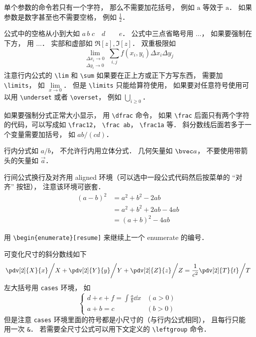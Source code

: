 单个参数的命令若只有一个字符， 那么不需要加花括号， 例如 $\mathrm a$ 等效于 $\mathrm{a}$． 如果参数是数字甚至也不需要空格， 例如 $\frac12$．

公式中的空格从小到大如 $a\, b\; c\quad d\qquad e$． 公式中三点省略号用 $\dots$， 如果要强制在下方， 用 $\ldots$． 实部和虚部如 $\Re[z], \Im[z]$． 双重极限如
\begin{equation}
\lim_{\substack{\Delta x_i\to 0\\ \Delta y_i\to 0}} \sum_{i, j} f(x_i,y_i) \Delta x_i \Delta y_j
\end{equation}
注意行内公式的 \verb|\lim| 和 \verb|\sum| 如果要在正上方或正下方写东西， 需要加 \verb|\limits|， 如 $\lim\limits_{x\to 0}$． 但是 \verb|\limits| 只能给算符使用， 如果要对任意符号使用可以用 \verb|\underset| 或者 \verb|\overset|， 例如 $\underset{i \ge 0}{\bigcup}$．

如果要强制分式正常大小显示， 用 \verb|\dfrac| 命令， 如果 \verb|\frac| 后面只有两个字符的代码，可以写成如 \verb|\frac12|， \verb|\frac ab|， \verb|\frac1a| 等． 斜分数线后面若多于一个变量需要加括号， 如 $ab/(cd)$．

行内分式如 $a/b$， 不允许行内用立体分式． 几何矢量如 $\bvec a$， 不要使用带箭头的矢量如 $\vec a$． 

行间公式换行及对齐用 aligned 环境（可以选中一段公式代码然后按菜单的 “对齐” 按钮）， 注意该环境可嵌套．
\begin{equation}
\begin{aligned}
(a-b)^2 &= a^2+b^2 - 2ab \\
& = a^2+b^2+2ab-4ab\\
& = (a+b)^2-4ab
\end{aligned}
\end{equation}

用 \verb|\begin{enumerate}[resume]|  来继续上一个 enumerate 的编号．

可变化尺寸的斜分数线如下
\begin{equation}
\left. \pdv[2]{X}{x} \middle/ X + \pdv[2]{Y}{y} \middle/ Y + \pdv[2]{Z}{z} \middle/ Z  = \frac{1}{c^2}  \pdv[2]{T}{t} \middle/ T\right.
\end{equation}
左大括号用 \verb|cases| 环境， 如
\begin{equation}
\begin{cases}
d+e+f = \int \frac{a}{b} \dd{x} &(a > 0)\\
a+b = c &(b > 0)
\end{cases}
\end{equation}
但是注意 \verb|cases| 环境里面的符号都是小尺寸的（与行内公式相同）， 且每行只能用一次 \verb|&|． 若需要全尺寸公式可以用下文定义的 \verb|\leftgroup| 命令．

